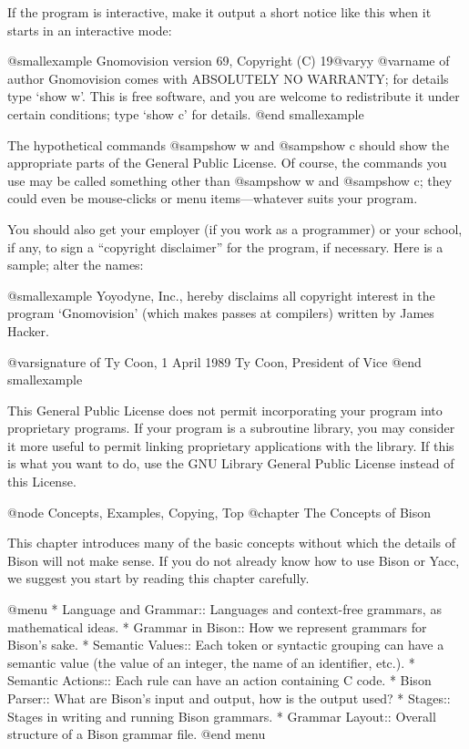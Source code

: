 If the program is interactive, make it output a short notice like this
when it starts in an interactive mode:

@smallexample
Gnomovision version 69, Copyright (C) 19@var{yy} @var{name of author}
Gnomovision comes with ABSOLUTELY NO WARRANTY; for details 
type `show w'.
This is free software, and you are welcome to redistribute it
under certain conditions; type `show c' for details.
@end smallexample

The hypothetical commands @samp{show w} and @samp{show c} should show
the appropriate parts of the General Public License.  Of course, the
commands you use may be called something other than @samp{show w} and
@samp{show c}; they could even be mouse-clicks or menu items---whatever
suits your program.

You should also get your employer (if you work as a programmer) or your
school, if any, to sign a ``copyright disclaimer'' for the program, if
necessary.  Here is a sample; alter the names:

@smallexample
Yoyodyne, Inc., hereby disclaims all copyright interest in the program
`Gnomovision' (which makes passes at compilers) written by James Hacker.

@var{signature of Ty Coon}, 1 April 1989
Ty Coon, President of Vice
@end smallexample

This General Public License does not permit incorporating your program into
proprietary programs.  If your program is a subroutine library, you may
consider it more useful to permit linking proprietary applications with the
library.  If this is what you want to do, use the GNU Library General
Public License instead of this License.

@node Concepts, Examples, Copying, Top
@chapter The Concepts of Bison

This chapter introduces many of the basic concepts without which the
details of Bison will not make sense.  If you do not already know how to
use Bison or Yacc, we suggest you start by reading this chapter carefully.

@menu
* Language and Grammar::  Languages and context-free grammars,
                            as mathematical ideas.
* Grammar in Bison::  How we represent grammars for Bison's sake.
* Semantic Values::   Each token or syntactic grouping can have
                        a semantic value (the value of an integer,
                        the name of an identifier, etc.).
* Semantic Actions::  Each rule can have an action containing C code.
* Bison Parser::      What are Bison's input and output,
                        how is the output used?
* Stages::            Stages in writing and running Bison grammars.
* Grammar Layout::    Overall structure of a Bison grammar file.
@end menu

